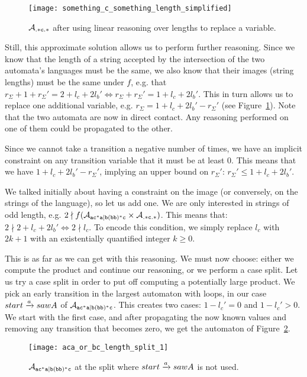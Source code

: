 \documentclass[acmsmall,review,anonymous,screen]{acmart}\settopmatter{printfolios=true,printccs=false,printacmref=true}
\theoremstyle{definition}
\begin{document}
\begin{figure}[h]
  \centering 
    \texttt{[image: something\_c\_something\_length\_simplified]}
    \caption{$\mathcal{A}_{\mathtt{.*c.*}}{}$ after using linear reasoning over lengths to replace a variable.}\label{fig:example-length-reduced}
  \end{figure}

Still, this approximate solution allows us to perform further reasoning. Since
we know that the length of a string accepted by the intersection of the two
automata's languages must be the same, we also know that their images (string
lengths) must be the same under $f$, e.g. that $r_\Sigma + 1 + r_\Sigma' = 2 +
l_c + 2l_b' \iff r_\Sigma + r_\Sigma' = 1 + l_c + 2l_b'$. This in turn allows us
to replace one additional variable, e.g. $r_\Sigma = 1 + l_c + 2l_b' -
r_\Sigma'$ (see Figure~\ref{fig:example-length-reduced}). Note that the two
automata are now in direct contact. Any reasoning performed on one of them could
be propagated to the other.

Since we cannot take a transition a negative number of times, we have an
implicit constraint on any transition variable that it must be at least $0$.
This means that we have $1 + l_c + 2l_b' - r_\Sigma'$, implying an upper bound
on $r_\Sigma'$: $r_\Sigma' \leq 1 + l_c + 2l_b'$.

We talked initially about having a constraint on the image (or conversely, on
the strings of the language), so let us add one. We are only interested in
strings of odd length, e.g. $2 \nmid  f(\mathcal{A}_{\mathtt{ac^*a|b(bb)^*c}} \times \mathcal{A}_{\mathtt{.*c.*}})$.
This means that: $2 \nmid 2 + l_c + 2l_b' \iff 2 \nmid l_c$. To encode this condition, we simply replace $l_c$ with $2k + 1$ with an existentially quantified integer $k \geq 0$.

This is as far as we can get with this reasoning. We must now choose: either we
compute the product and continue our reasoning, or we perform a case split. Let
us try a case split in order to put off computing a potentially large product.
We pick an early transition in the largest automaton with loops, in our case
$start \xrightarrow{a} sawA$ of $\mathcal{A}_{\mathtt{ac^*a|b(bb)^*c}}$. This creates two cases: $1-l_c' =
0$ and $1-l_c' > 0$. We start with the first case, and after propagating the now known values and removing any transition that becomes zero, we get the automaton of Figure~\ref{fig:aca-or-bc-length-split-1}.


\begin{figure}[h]
  \centering 
    \texttt{[image: aca\_or\_bc\_length\_split\_1]}
    \caption{$\mathcal{A}_{\mathtt{ac^*a|b(bb)^*c}}{}$ at the split where $start \xrightarrow{a} sawA$ is not used.}\label{fig:aca-or-bc-length-split-1}
  \end{figure}
\end{document}
